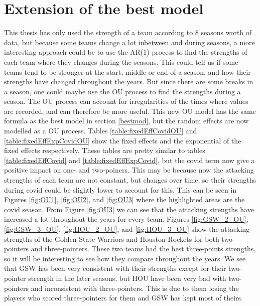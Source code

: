 \newpage

\section{Extension of the best model}

\noindent This thesis has only used the strength of a team according to 8 seasons worth of data, but because some teams change a lot inbetween and during seasons, a more interesting approach could be to use the AR(1) process to find the strengths of each team where they changes during the seasons. This could tell us if some teams tend to be stronger at the start, middle or end of a season, and how their strengths have changed throughout the years. But since there are some breaks in a season, one could maybe use the OU process to find the strengths during a season. The OU process can account for irregularities of the times where values are recorded, and can therefore be more useful. This new OU model has the same formula as the best model in section \ref{bestmod}, but the random effects are now modelled as a OU process. Tables \ref{table:fixedEffCovidOU} and \ref{table:fixedEffExpCovidOU} show the fixed effects and the exponential of the fixed effects respectively. These tables are pretty similar to tables \ref{table:fixedEffCovid} and \ref{table:fixedEffExpCovid}, but the covid term now give a positive impact on one- and two-poiners. This may be because now the attacking strengths of each team are not constant, but changes over time, so their strengths during covid could be slightly lower to account for this. This can be seen in Figures \ref{fig:OU1}, \ref{fig:OU2}, and \ref{fig:OU3} where the highlighted areas are the covid season. From Figure \ref{fig:OU3} we can see that the attacking strengths have increased a lot throughout the years for every team. Figures \ref{fig:GSW_2_OU}, \ref{fig:GSW_3_OU}, \ref{fig:HOU_2_OU}, and \ref{fig:HOU_3_OU} show the attacking strengths of the Golden State Warriors and Houston Rockets for both two-pointers and three-pointers. These two teams had the best three-points strengths, so it will be interesting to see how they compare throughout the years. We see that GSW has been very consistent with their strengths except for their two-pointer strength in the later seasons, but HOU have been very bad with two-pointers and inconsistent with three-pointers. This is due to them losing the players who scored three-pointers for them and GSW has kept most of theirs.

